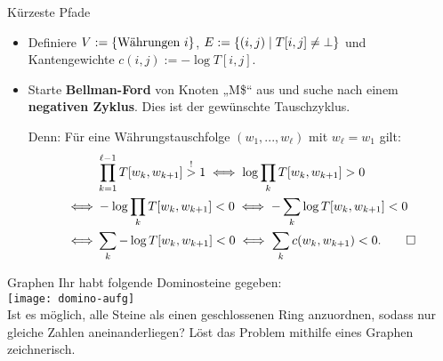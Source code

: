 \begin{frame}{Kürzeste Pfade}
	\solutionheading 
	\begin{itemize}
		\item Definiere $V := \left\{\text{Währungen $i$}\right\}$, $E := \left\{(i, j) \;\middle|\; T[i,j] \neq \bot\right\}$ und Kantengewichte $c(i, j) := -\log T[i,j]$. 
		\pause
		\item Starte \textbf{Bellman-Ford} von Knoten „M\$“ aus und suche nach einem \textbf{negativen Zyklus}. Dies ist der gewünschte Tauschzyklus.
		\pause
		\item [Denn:\!] Für eine Währungstauschfolge $(w_1, ..., w_\ell)$ mit $w_\ell = w_1$ gilt: 
		\begin{align*}
			& \prod_{k = 1}^{{\ell-1}} T[w_k, w_{k+1}] \stackrel{!}{>} 1 \Gdw \log \prod_k T[w_k, w_{k+1}] > 0 \\ 
			{\Gdw} &-\log \prod_k T[w_k, w_{k+1}] < 0 \Gdw -\sum_k \log T[w_k, w_{k+1}] < 0 \\
			{\Gdw} & \sum_k -\log T[w_k, w_{k+1}] < 0 \Gdw \sum_k c(w_k, w_{k+1}) < 0. \qed
		\end{align*}
	\end{itemize}
\end{frame}


\begin{frame}{Graphen}
	Ihr habt folgende Dominosteine gegeben: \\
	\texttt{[image: domino-aufg]} \\
	Ist es möglich, alle Steine als einen geschlossenen Ring anzuordnen, sodass nur gleiche Zahlen aneinanderliegen? Löst das Problem mithilfe eines Graphen zeichnerisch.
\end{frame}

